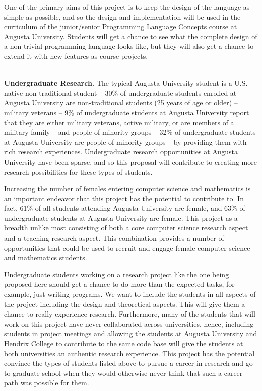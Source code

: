 One of the primary aims of this project is to keep the design of the
language as simple as possible, and so the design and implementation
will be used in the curriculum of the junior/senior Programming
Language Concepts course at Augusta University.  Students will get a
chance to see what the complete design of a non-trivial programming
language looks like, but they will also get a chance to extend it with
new features as course projects.

\ \\
\noindent
\textbf{Undergraduate Research.}  The typical Augusta University
student is a U.S. native non-traditional student -- 30\% of
undergraduate students enrolled at Augusta University are
non-traditional students (25 years of age or older) -- military
veterans -- 9\% of undergraduate students at Augusta University report
that they are either military veterans, active military, or are
members of a military family -- and people of minority groups -- 32\%
of undergraduate students at Augusta University are people of minority
groups -- by providing them with rich research
experiences. Undergraduate research opportunities at Augusta
University have been sparse, and so this proposal will contribute to
creating more research possibilities for these types of students.


Increasing the number of females entering computer science and
mathematics is an important endeavor that this project has the
potential to contribute to.  In fact, 61\% of all students attending
Augusta University are female, and 63\% of undergraduate students at
Augusta University are female.  This project as a breadth unlike most
consisting of both a core computer science research aspect and a
teaching research aspect.  This combination provides a number of
opportunities that could be used to recruit and engage female computer
science and mathematics students.

Undergraduate students working on a research project like the one
being proposed here should get a chance to do more than the expected
tasks, for example, just writing programs.  We want to include the
students in all aspects of the project including the design and
theoretical aspects.  This will give them a chance to really
experience research.  Furthermore, many of the students that will work
on this project have never collaborated across universities, hence,
including students in project meetings and allowing the students at
Augusta University and Hendrix College to contribute to the same code
base will give the students at both universities an authentic research
experience.  This project has the potential convince the types of
students listed above to pursue a career in research and go to
graduate school when they would otherwise never think that such a
career path was possible for them.
